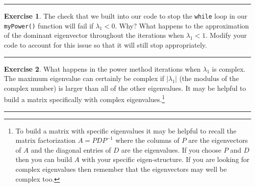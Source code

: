 \documentclass[
]{book}
\theoremstyle{definition}
\theoremstyle{definition}
\theoremstyle{definition}
\newtheorem{exercise}{Exercise}[chapter]
\theoremstyle{remark}
\begin{document}
\begin{center}\rule{0.5\linewidth}{0.5pt}\end{center}

\begin{exercise}
\protect\hypertarget{exr:unnamed-chunk-370}{}{\label{exr:unnamed-chunk-370} }The check that we built into our code to stop the \texttt{while} loop in our \texttt{myPower()} function will fail if \(\lambda_1 < 0\). Why? What happens to the approximation of the dominant eigenvector throughout the iterations when \(\lambda_1 < 1\). Modify your code to account for this issue so that it will still stop appropriately.
\end{exercise}

\begin{center}\rule{0.5\linewidth}{0.5pt}\end{center}

\begin{exercise}
\protect\hypertarget{exr:unnamed-chunk-371}{}{\label{exr:unnamed-chunk-371} }What happens in the power method iterations when \(\lambda_1\) is complex. The maximum eigenvalue can certainly be complex if \(|\lambda_1|\) (the modulus of the complex number) is larger than all of the other eigenvalues. It may be helpful to build a matrix specifically with complex eigenvalues.\footnote{To build a matrix with specific eigenvalues it may be helpful to recall the matrix factorization \(A = PDP^{-1}\) where the columns of \(P\) are the eigenvectors of \(A\) and the diagonal entries of \(D\) are the eigenvalues. If you choose \(P\) and \(D\) then you can build \(A\) with your specific eigen-structure. If you are looking for complex eigenvalues then remember that the eigenvectors may well be complex too.}
\end{exercise}

\begin{center}\rule{0.5\linewidth}{0.5pt}\end{center}
\end{document}
